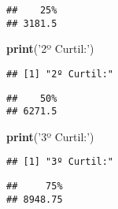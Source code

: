 \documentclass[runningheads,a4paper]{llncs}
\newenvironment{Shaded}{}{}
\newcommand{\KeywordTok}[1]{\textcolor[rgb]{0.00,0.44,0.13}{\textbf{{#1}}}}
\newcommand{\DecValTok}[1]{\textcolor[rgb]{0.25,0.63,0.44}{{#1}}}
\newcommand{\StringTok}[1]{\textcolor[rgb]{0.25,0.44,0.63}{{#1}}}
\newcommand{\NormalTok}[1]{{#1}}
\newcommand{\OperatorTok}[1]{\textcolor[rgb]{0.40,0.40,0.40}{{#1}}}
\begin{document}
\begin{verbatim}
##    25% 
## 3181.5
\end{verbatim}

\begin{Shaded}
\begin{Highlighting}[]
\KeywordTok{print}\NormalTok{(}\StringTok{'2º Curtil:'}\NormalTok{)}
\end{Highlighting}
\end{Shaded}

\begin{verbatim}
## [1] "2º Curtil:"
\end{verbatim}

\begin{Shaded}
\end{Shaded}

\begin{verbatim}
##    50% 
## 6271.5
\end{verbatim}

\begin{Shaded}
\begin{Highlighting}[]
\KeywordTok{print}\NormalTok{(}\StringTok{'3º Curtil:'}\NormalTok{)}
\end{Highlighting}
\end{Shaded}

\begin{verbatim}
## [1] "3º Curtil:"
\end{verbatim}

\begin{Shaded}
\end{Shaded}

\begin{verbatim}
##     75% 
## 8948.75
\end{verbatim}
\end{document}
